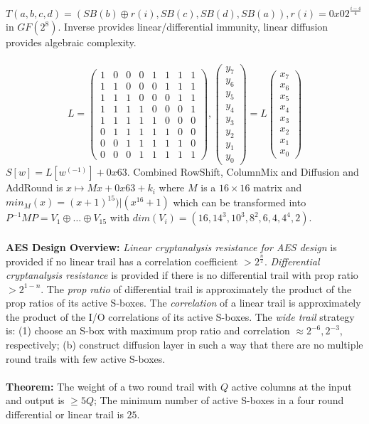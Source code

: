 $T(a,b,c,d)= 
(SB(b) \oplus r(i), SB(c), SB(d), SB(a)), r(i)= 0x02^{\frac {i-4} 4}$
in $GF(2^8)$.
Inverse provides linear/differential immunity,
linear diffusion provides algebraic complexity.
\\
\\
$$
L=
\left(
\begin{array}{cccccccc}
1 & 0 & 0 & 0 & 1 & 1 & 1 & 1 \\
1 & 1 & 0 & 0 & 0 & 1 & 1 & 1 \\
1 & 1 & 1 & 0 & 0 & 0 & 1 & 1 \\
1 & 1 & 1 & 1 & 0 & 0 & 0 & 1 \\
1 & 1 & 1 & 1 & 1 & 0 & 0 & 0 \\
0 & 1 & 1 & 1 & 1 & 1 & 0 & 0 \\
0 & 0 & 1 & 1 & 1 & 1 & 1 & 0 \\
0 & 0 & 0 & 1 & 1 & 1 & 1 & 1  
\end{array}
\right), 
\left(
\begin{array}{c}
y_7 \\
y_6 \\
y_5 \\
y_4 \\
y_3 \\
y_2 \\
y_1 \\
y_0
\end{array}
\right)
= L
\left(
\begin{array}{c}
x_7 \\
x_6 \\
x_5 \\
x_4 \\
x_3 \\
x_2 \\
x_1 \\
x_0
\end{array}
\right)
$$
$S[w]= L[w^{(-1)}] + 0x63$.   Combined RowShift, ColumnMix and Diffusion and AddRound is
$x \mapsto Mx + 0x63 + k_i$ where $M$ is a $16 \times 16$ matrix and
$min_M (x)= (x+1)^{15}) | (x^{16} +1)$ which can be transformed into
$P^{-1} M P= V_1 \oplus \ldots \oplus V_{15}$ with $dim(V_i)= (16, 14^3, 10^3, 8^2,6,4,4^4,2)$.
\\
\\
{\bf AES Design Overview:}
\emph{Linear cryptanalysis resistance for AES design} is provided if no linear trail has a
correlation coefficient $>2^{\frac n 2}$.  \emph{Differential cryptanalysis resistance} is
provided if there is no differential trail with prop ratio $>2^{1-n}$.  
The \emph{prop ratio} of differential trail is 
approximately the product of the prop ratios of its active S-boxes.
The \emph{correlation} of a linear trail is approximately the 
product of the I/O correlations of its active S-boxes.  
The \emph{wide trail} strategy is: (1) choose an S-box with maximum
prop ratio and correlation $\approx 2^{-6}, 2^{-3}$, respectively; 
(b) construct diffusion layer
in such a way that there are no multiple round trails with few active S-boxes.
\\
\\
{\bf Theorem:}
The weight of a two round trail with $Q$ active columns at the input 
and output is $\ge 5Q$; The minimum number of active 
S-boxes in a four round differential or linear trail is $25.$
